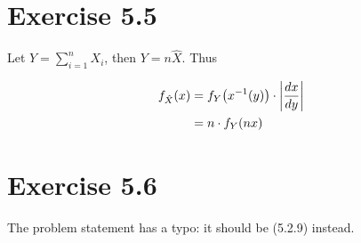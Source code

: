 \documentclass[12pt,letterpaper,reqno]{amsart}
\numberwithin{equation}{subsection}
\begin{document}
\newpage
\section{Exercise 5.5}

Let $Y = \sum_{i=1}^n X_i$, then $Y = n \hat{X}$. Thus

\begin{align*}
    {f_{\hat{X}}}\! \left( {x} \right) &= {f_Y}\! \left( {x^{-1}(y)} \right) \cdot \left\lvert{\frac{d{x}}{d{y}}}\right\rvert \\
    &= n \cdot {f_Y}\! \left( {nx} \right)
\end{align*}

\newpage
\section{Exercise 5.6}

The problem statement has a typo: it should be (5.2.9) instead.
\end{document}
